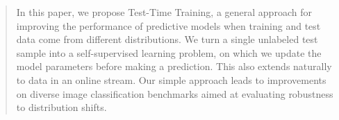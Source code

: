 \documentclass{article}
\begin{document}



\printAffiliationsAndNotice{} %

\begin{abstract}
In this paper, we propose Test-Time Training, a general approach for improving the performance of predictive models when training and test data come from different distributions. We turn a single unlabeled test sample into a self-supervised learning problem, on which we update the model parameters before making a prediction. This also extends naturally to data in an online stream. Our simple approach leads to improvements on diverse image classification benchmarks aimed at evaluating robustness to distribution shifts.
\end{abstract}
\end{document}
